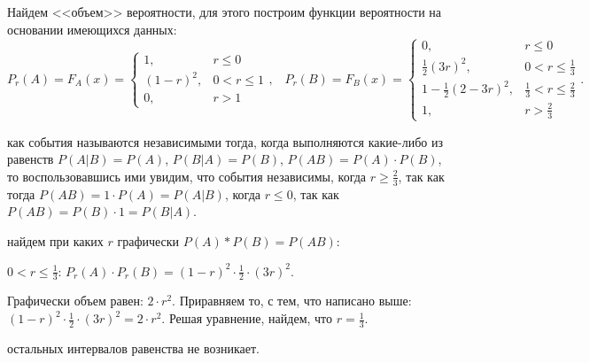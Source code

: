 \begin{solution} 
  Найдем <<объем>> вероятности, для этого построим функции вероятности на основании имеющихся данных:
\[
P_r(A) = F_A(x) =
\begin{cases}
  1, & r \le 0 \\
  (1 - r)^2, & 0 < r \le 1 \\
  0, & r > 1
\end{cases}, 
\;\;\;P_r(B) = F_B(x) = 
\begin{cases}
  0, & r \le 0 \\
  \frac{1}{2}(3r)^2, & 0 < r \le  \frac{1}{3} \\
  1 - \frac{1}{2}(2 - 3r)^2, & \frac{1}{3} < r \le \frac{2}{3} \\
  1, & r > \frac{2}{3}
\end{cases}
.\] 

 как события называются независимыми тогда, когда выполняются какие-либо из равенств 
$P(A | B) = P(A)$, $P(B | A) = P(B)$, $P(AB) = P(A) \cdot P(B)$, то воспользовавшись ими увидим, 
что события независимы, когда $r \ge  \frac{2}{3}$, так как тогда $P(AB) = 1 \cdot P(A) = P(A | B)$,
когда $r \le 0$, так как $P(AB) = P(B) \cdot 1 = P(B | A)$.

\medskip
{} найдем при каких $r$ графически $P(A) * P(B) = P(AB)$:

\smallskip
{} $0 < r \le \frac{1}{3}$: $P_r(A) \cdot  P_r(B) = (1 - r)^2 \cdot \frac{1}{2} \cdot (3r)^2$.

\begin{center}
\end{center}

Графически объем равен: $2\cdot r^2$. Приравняем то, с тем, что написано выше: $(1 - r)^2 \cdot \frac{1}{2} \cdot (3r)^2 = 2\cdot r^2$.
Решая уравнение, найдем, что $r = \frac{1}{3}$.

\smallskip
{} остальных интервалов равенства не возникает. 
\end{solution}


